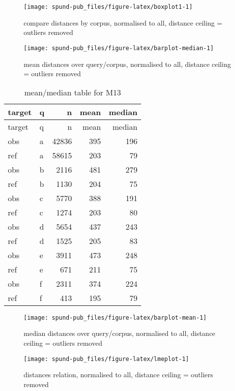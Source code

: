 \documentclass[
  12pt,
  oneside]{book}
\begin{document}
\begin{figure}[H]
\texttt{[image: spund-pub\_files/figure-latex/boxplot1-1]} \caption{compare distances by corpus, normalised to all, distance ceiling =  outliers removed}\label{fig:boxplot1}
\end{figure}

\begin{figure}[H]
\texttt{[image: spund-pub\_files/figure-latex/barplot-median-1]} \caption{mean distances over query/corpus, normalised to all, distance ceiling =  outliers removed}\label{fig:barplot-median}
\end{figure}

\begin{longtable}[]{@{}llrrr@{}}
\caption{\label{tab:dfe-table}mean/median table for M13}\tabularnewline
\toprule\noalign{}
target & q & n & mean & median \\
\midrule\noalign{}
\endfirsthead
\toprule\noalign{}
target & q & n & mean & median \\
\midrule\noalign{}
\endhead
\bottomrule\noalign{}
\endlastfoot
obs & a & 42836 & 395 & 196 \\
ref & a & 58615 & 203 & 79 \\
obs & b & 2116 & 481 & 279 \\
ref & b & 1130 & 204 & 75 \\
obs & c & 5770 & 388 & 191 \\
ref & c & 1274 & 203 & 80 \\
obs & d & 5654 & 437 & 243 \\
ref & d & 1525 & 205 & 83 \\
obs & e & 3911 & 473 & 248 \\
ref & e & 671 & 211 & 75 \\
obs & f & 2311 & 374 & 224 \\
ref & f & 413 & 195 & 79 \\
\end{longtable}

\begin{figure}[H]
\texttt{[image: spund-pub\_files/figure-latex/barplot-mean-1]} \caption{median distances over query/corpus, normalised to all, distance ceiling =  outliers removed}\label{fig:barplot-mean}
\end{figure}

\begin{figure}[H]
\texttt{[image: spund-pub\_files/figure-latex/lmeplot-1]} \caption{distances relation, normalised to all, distance ceiling =  outliers removed}\label{fig:lmeplot}
\end{figure}
\end{document}
